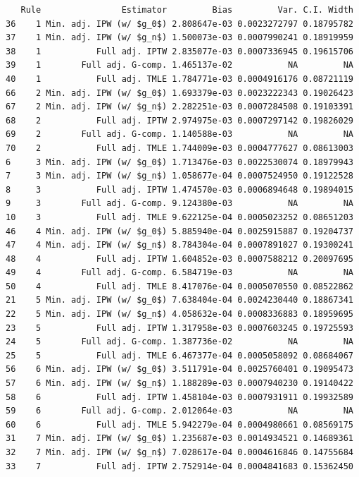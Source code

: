 \documentclass[11pt]{article}\usepackage[]{graphicx}\usepackage[]{color}
\makeatletter
\newenvironment{kframe}{%
 \def\at@end@of@kframe{}%
 \ifinner\ifhmode%
  \def\at@end@of@kframe{\end{minipage}}%
  \begin{minipage}{\columnwidth}%
 \fi\fi%
 \def\FrameCommand##1{\hskip\@totalleftmargin \hskip-\fboxsep
 \colorbox{shadecolor}{##1}\hskip-\fboxsep
     \hskip-\linewidth \hskip-\@totalleftmargin \hskip\columnwidth}%
 \MakeFramed {\advance\hsize-\width
   \@totalleftmargin\z@ \linewidth\hsize
   \@setminipage}}%
 {\par\unskip\endMakeFramed%
 \at@end@of@kframe}
\newenvironment{knitrout}{}{} %
\makeatother
\begin{document}
\begin{knitrout}
\color{fgcolor}\begin{kframe}
\begin{verbatim}
   Rule                Estimator         Bias         Var. C.I. Width
36    1 Min. adj. IPW (w/ $g_0$) 2.808647e-03 0.0023272797 0.18795782
37    1 Min. adj. IPW (w/ $g_n$) 1.500073e-03 0.0007990241 0.18919959
38    1           Full adj. IPTW 2.835077e-03 0.0007336945 0.19615706
39    1        Full adj. G-comp. 1.465137e-02           NA         NA
40    1           Full adj. TMLE 1.784771e-03 0.0004916176 0.08721119
66    2 Min. adj. IPW (w/ $g_0$) 1.693379e-03 0.0023222343 0.19026423
67    2 Min. adj. IPW (w/ $g_n$) 2.282251e-03 0.0007284508 0.19103391
68    2           Full adj. IPTW 2.974975e-03 0.0007297142 0.19826029
69    2        Full adj. G-comp. 1.140588e-03           NA         NA
70    2           Full adj. TMLE 1.744009e-03 0.0004777627 0.08613003
6     3 Min. adj. IPW (w/ $g_0$) 1.713476e-03 0.0022530074 0.18979943
7     3 Min. adj. IPW (w/ $g_n$) 1.058677e-04 0.0007524950 0.19122528
8     3           Full adj. IPTW 1.474570e-03 0.0006894648 0.19894015
9     3        Full adj. G-comp. 9.124380e-03           NA         NA
10    3           Full adj. TMLE 9.622125e-04 0.0005023252 0.08651203
46    4 Min. adj. IPW (w/ $g_0$) 5.885940e-04 0.0025915887 0.19204737
47    4 Min. adj. IPW (w/ $g_n$) 8.784304e-04 0.0007891027 0.19300241
48    4           Full adj. IPTW 1.604852e-03 0.0007588212 0.20097695
49    4        Full adj. G-comp. 6.584719e-03           NA         NA
50    4           Full adj. TMLE 8.417076e-04 0.0005070550 0.08522862
21    5 Min. adj. IPW (w/ $g_0$) 7.638404e-04 0.0024230440 0.18867341
22    5 Min. adj. IPW (w/ $g_n$) 4.058632e-04 0.0008336883 0.18959695
23    5           Full adj. IPTW 1.317958e-03 0.0007603245 0.19725593
24    5        Full adj. G-comp. 1.387736e-02           NA         NA
25    5           Full adj. TMLE 6.467377e-04 0.0005058092 0.08684067
56    6 Min. adj. IPW (w/ $g_0$) 3.511791e-04 0.0025760401 0.19095473
57    6 Min. adj. IPW (w/ $g_n$) 1.188289e-03 0.0007940230 0.19140422
58    6           Full adj. IPTW 1.458104e-03 0.0007931911 0.19932589
59    6        Full adj. G-comp. 2.012064e-03           NA         NA
60    6           Full adj. TMLE 5.942279e-04 0.0004980661 0.08569175
31    7 Min. adj. IPW (w/ $g_0$) 1.235687e-03 0.0014934521 0.14689361
32    7 Min. adj. IPW (w/ $g_n$) 7.028617e-04 0.0004616846 0.14755684
33    7           Full adj. IPTW 2.752914e-04 0.0004841683 0.15362450

\end{verbatim}
\end{kframe}
\end{knitrout}
\end{document}
